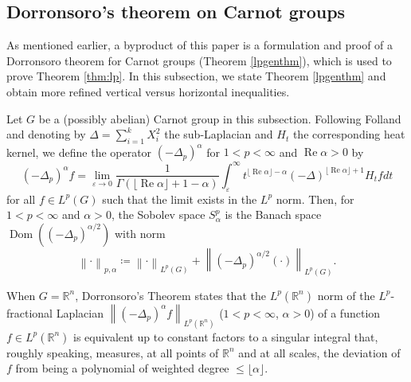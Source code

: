 \documentclass[11pt,reqno]{amsart}
\newcommand{\1}{\mathbf 1}
\begin{document}
 









\subsection{Dorronsoro's theorem on Carnot groups}\label{subsec:dorronsoro}






As mentioned earlier, a byproduct of this paper is a formulation and proof of a Dorronsoro theorem for Carnot groups (Theorem \ref{lpgenthm}), which is used to prove Theorem \ref{thm:lp}. In this subsection, we state Theorem \ref{lpgenthm} and obtain more refined vertical versus horizontal inequalities.

Let $G$ be a (possibly abelian) Carnot group in this subsection. Following Folland \cite{folland1975subelliptic} and denoting by $\Delta=\sum_{i=1}^k X_i^2$ the sub-Laplacian and $H_t$ the corresponding heat kernel, we define the operator $\left(-\Delta_p\right)^\alpha$ for $1<p<\infty$ and $\operatorname{Re}\alpha>0$ by
\[
\left(-\Delta_p\right)^\alpha f=\lim_{\varepsilon\to 0}\frac{1}{\Gamma\left(\lfloor\operatorname{Re}\alpha\rfloor+1-\alpha\right)}\int_\varepsilon^\infty t^{\lfloor \operatorname{Re}\alpha\rfloor-\alpha}\left(-\Delta\right)^{\lfloor\operatorname{Re}\alpha\rfloor+1}H_tfdt
\]
for all $f\in L^p\left(G\right)$ such that the limit exists in the $L^p$ norm. Then, for $1<p<\infty$ and $\alpha>0$, the Sobolev space $S^p_\alpha$ is the Banach space $\operatorname{Dom}\left(\left(-\Delta_p\right)^{\alpha/2}\right)$ with norm
\[
\left\|\cdot\right\|_{p,\alpha}\coloneqq \left\|\cdot\right\|_{L^p\left(G\right)}+\left\|\left(-\Delta_p\right)^{\alpha/2}\left(\cdot\right)\right\|_{L^p\left(G\right)}.
\]

When $G=\mathbb{R}^n$, Dorronsoro's Theorem \cite{dorronsoro1985characterization} states that the $L^p\left(\mathbb{R}^n\right)$ norm of the $L^p$-fractional Laplacian $\left\|\left(-\Delta_p\right)^\alpha f\right\|_{L^p\left(\mathbb{R}^n\right)}$ ($1<p<\infty$, $\alpha>0$) of a function $f\in L^p\left(\mathbb{R}^n\right)$ is equivalent up to constant factors to a singular integral that, roughly speaking, measures, at all points of $\mathbb{R}^n$ and at all scales, the deviation of $f$ from being a polynomial of weighted degree $\le \lfloor\alpha\rfloor$. 
\end{document}
